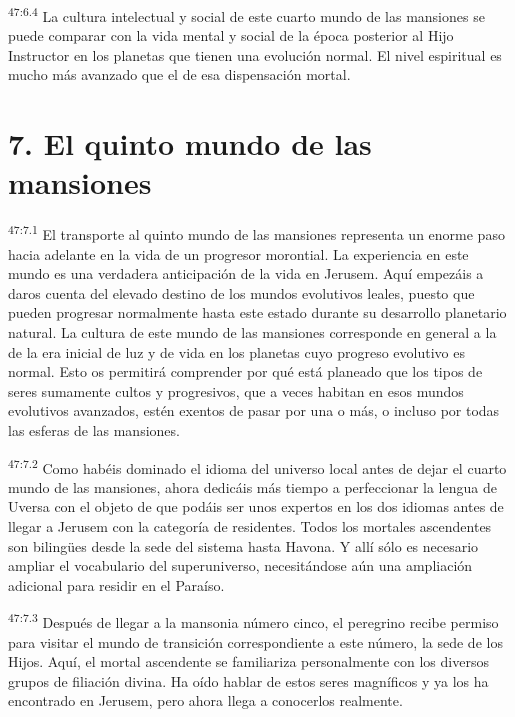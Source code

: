 \par
\textsuperscript{47:6.4} La cultura intelectual y social de este cuarto mundo de las mansiones se puede comparar con la vida mental y social de la época posterior al Hijo Instructor en los planetas que tienen una evolución normal. El nivel espiritual es mucho más avanzado que el de esa dispensación mortal.

\section*{7. El quinto mundo de las mansiones}
\par
\textsuperscript{47:7.1} El transporte al quinto mundo de las mansiones representa un enorme paso hacia adelante en la vida de un progresor morontial. La experiencia en este mundo es una verdadera anticipación de la vida en Jerusem. Aquí empezáis a daros cuenta del elevado destino de los mundos evolutivos leales, puesto que pueden progresar normalmente hasta este estado durante su desarrollo planetario natural. La cultura de este mundo de las mansiones corresponde en general a la de la era inicial de luz y de vida en los planetas cuyo progreso evolutivo es normal. Esto os permitirá comprender por qué está planeado que los tipos de seres sumamente cultos y progresivos, que a veces habitan en esos mundos evolutivos avanzados, estén exentos de pasar por una o más, o incluso por todas las esferas de las mansiones.

\par
\textsuperscript{47:7.2} Como habéis dominado el idioma del universo local antes de dejar el cuarto mundo de las mansiones, ahora dedicáis más tiempo a perfeccionar la lengua de Uversa con el objeto de que podáis ser unos expertos en los dos idiomas antes de llegar a Jerusem con la categoría de residentes. Todos los mortales ascendentes son biling\"ues desde la sede del sistema hasta Havona. Y allí sólo es necesario ampliar el vocabulario del superuniverso, necesitándose aún una ampliación adicional para residir en el Paraíso.

\par
\textsuperscript{47:7.3} Después de llegar a la mansonia número cinco, el peregrino recibe permiso para visitar el mundo de transición correspondiente a este número, la sede de los Hijos. Aquí, el mortal ascendente se familiariza personalmente con los diversos grupos de filiación divina. Ha oído hablar de estos seres magníficos y ya los ha encontrado en Jerusem, pero ahora llega a conocerlos realmente.

